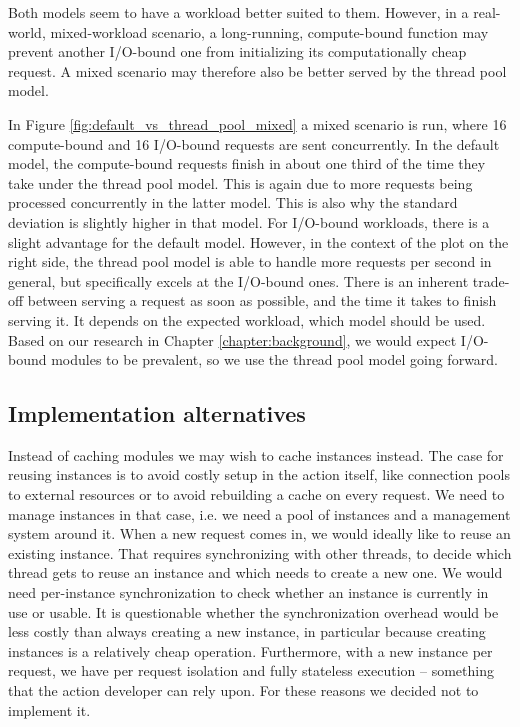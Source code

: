 Both models seem to have a workload better suited to them. However, in a real-world, mixed-workload scenario, a long-running, compute-bound function may prevent another I/O-bound one from initializing its computationally cheap request. A mixed scenario may therefore also be better served by the thread pool model.

In Figure \ref{fig:default_vs_thread_pool_mixed} a mixed scenario is run, where 16 compute-bound and 16 I/O-bound requests are sent concurrently. In the default model, the compute-bound requests finish in about one third of the time they take under the thread pool model. This is again due to more requests being processed concurrently in the latter model. This is also why the standard deviation is slightly higher in that model. For I/O-bound workloads, there is a slight advantage for the default model. However, in the context of the plot on the right side, the thread pool model is able to handle more requests per second in general, but specifically excels at the I/O-bound ones. There is an inherent trade-off between serving a request as soon as possible, and the time it takes to finish serving it. It depends on the expected workload, which model should be used. Based on our research in Chapter \ref{chapter:background}, we would expect I/O-bound modules to be prevalent, so we use the thread pool model going forward.


\subsection{Implementation alternatives}

Instead of caching modules we may wish to cache instances instead. The case for reusing instances is to avoid costly setup in the action itself, like connection pools to external resources or to avoid rebuilding a cache on every request.
We need to manage instances in that case, i.e. we need a pool of instances and a management system around it. When a new request comes in, we would ideally like to reuse an existing instance. That requires synchronizing with other threads, to decide which thread gets to reuse an instance and which needs to create a new one. We would need per-instance synchronization to check whether an instance is currently in use or usable. It is questionable whether the synchronization overhead would be less costly than always creating a new instance, in particular because creating instances is a relatively cheap operation. 
Furthermore, with a new instance per request, we have per request isolation and fully stateless execution -- something that the action developer can rely upon. For these reasons we decided not to implement it.

